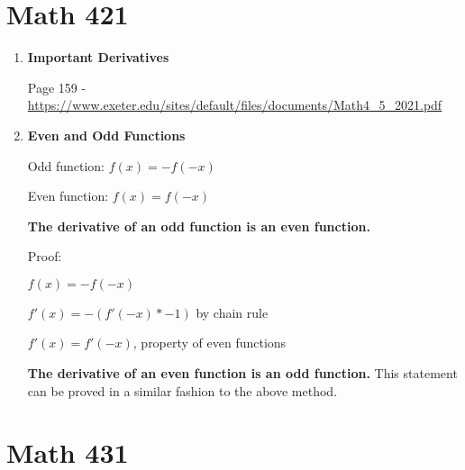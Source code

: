 \documentclass[11pt,twoside]{article}
\begin{document}



\section{Math 421}

\begin{enumerate}
    \item \textbf{Important Derivatives}
    
    Page 159 - \url{https://www.exeter.edu/sites/default/files/documents/Math4_5_2021.pdf}
    
    \item \textbf{Even and Odd Functions}
    
    Odd function: $f(x) = -f(-x)$
    
    Even function: $f(x) = f(-x)$
    
    \textbf{The derivative of an odd function is an even function.}
    
    Proof:

    $f(x) = -f(-x)$ 
    
    $f'(x) = -(f'(-x) * -1)$ by chain rule
    
    $f'(x) = f'(-x)$, property of even functions
    
    \textbf{The derivative of an even function is an odd function.} This statement can be proved in a similar fashion to the above method. 

\end{enumerate}

\section{Math 431}
\end{document}
